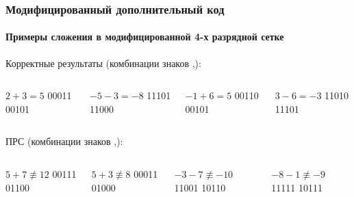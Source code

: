 \begin{frame}
    \frametitle{Модифицированный дополнительный код}
    \framesubtitle{Примеры сложения в модифицированной 4-х разрядной сетке}
    
    Корректные результаты (комбинации знаков ,):
    \begin{columns}
            \begin{block}{$2+3=5$}
                 \center
                          {00011}
                          {00101}
            \end{block}
            \begin{block}{${-5}-3=-8$}
                 \center
                          {11101}
                          {11000}
            \end{block}
            \begin{block}{${-1}+6=5$}
                 \center
                          {00110}
                          {00101}
            \end{block}
            \begin{block}{$3-6={-3}$}
                 \center
                          {11010}
                          {11101}
            \end{block}
    \end{columns}

    ПРС (комбинации знаков ,):
    
    \begin{columns}
            \begin{block}{$5+7\not\equiv 12$}
                 \center
                          {00111}
                          {01100}
            \end{block}
            \begin{block}{$5+3\not\equiv  8$}
                 \center
                          {00011}
                          {01000}
            \end{block}
            \begin{block}{$-3-7\not\equiv -10$}
                 \center
                          {11001}
                          {10110}
            \end{block}
            \begin{block}{$-8-1\not\equiv -9$}
                 \center
                          {11111}
                          {10111}
            \end{block}
    \end{columns}
\end{frame}

